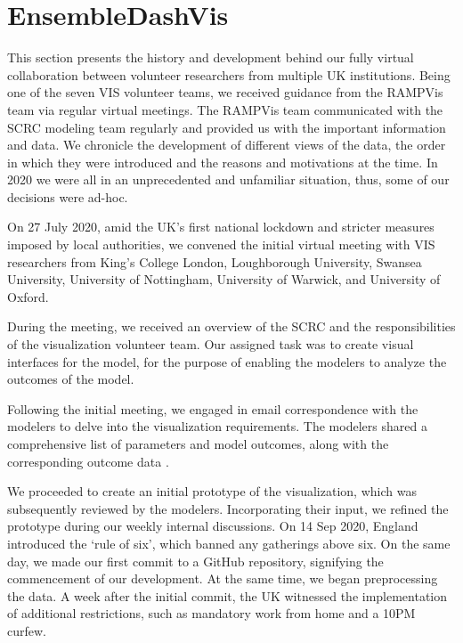 \section{EnsembleDashVis}
\label{sec:EnsembleDashVis}

This section presents the history and development behind our fully virtual collaboration between volunteer researchers from multiple UK institutions.
Being one of the seven VIS volunteer teams, we received guidance from the RAMPVis team via regular virtual meetings. The RAMPVis team communicated with the SCRC modeling team regularly and provided us with the important information and data.
We chronicle the development of different views of the data, the order in which they were introduced and the reasons and motivations at the time.
In 2020 we were all in an unprecedented and unfamiliar situation, thus, some of our decisions were ad-hoc.


\label{subsec:InitialMeeting}
On 27 July 2020, amid the UK's first national lockdown and stricter measures imposed by local authorities, we convened the initial virtual meeting with VIS researchers from King's College London, Loughborough University, Swansea University, University of Nottingham, University of Warwick, and University of Oxford.

During the meeting, we received an overview of the SCRC and the responsibilities of the visualization volunteer team.
Our assigned task was to create visual interfaces for the model, for the purpose of enabling the modelers to analyze the outcomes of the model.

Following the initial meeting, we engaged in email correspondence with the modelers to delve into the visualization requirements. The modelers shared a comprehensive list of parameters and model outcomes, along with the corresponding outcome data \cite{2020Covid19}.


We proceeded to create an initial prototype of the visualization, which was subsequently reviewed by the modelers.
Incorporating their input, we refined the prototype during our weekly internal discussions.
On 14 Sep 2020, England introduced the `rule of six', which banned any gatherings above six.
On the same day, we made our first commit to a GitHub repository, signifying the commencement of our development.
At the same time, we began preprocessing the data.
A week after the initial commit, the UK witnessed the implementation of additional restrictions, such as mandatory work from home and a 10PM curfew.

